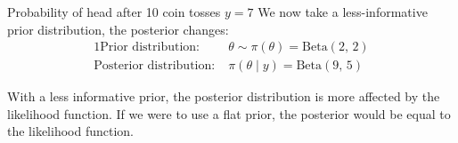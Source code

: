 \begin{example}{Probability of head after 10 coin tosses $y=7$}{}
	We now take a less-informative prior distribution, the posterior changes:
	\begin{alignat*}{1}
		\text{Prior distribution:}     & \; \theta \sim \pi(\theta) = \text{Beta}(2,\,2)                                 \\
		\text{Posterior distribution:} & \; \pi(\theta \mid y) = \text{Beta}(9,\,5)
	\end{alignat*}
	\vspace{-1em}
	\begin{nscenter}
	\end{nscenter}
	\begin{note}
		With a less informative prior, the posterior distribution is more affected by the
		likelihood function. If we were to use a flat prior, the posterior would be equal
		to the likelihood function.
	\end{note}
\end{example}

